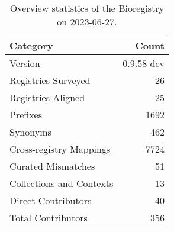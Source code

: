 \begin{table}
\caption{Overview statistics of the Bioregistry on 2023-06-27.}
\label{tab:bioregistry-summary}
\begin{tabular}{lr}
\toprule
Category & Count \\
\midrule
Version & 0.9.58-dev \\
Registries Surveyed & 26 \\
Registries Aligned & 25 \\
Prefixes & 1692 \\
Synonyms & 462 \\
Cross-registry Mappings & 7724 \\
Curated Mismatches & 51 \\
Collections and Contexts & 13 \\
Direct Contributors & 40 \\
Total Contributors & 356 \\
\bottomrule
\end{tabular}
\end{table}
